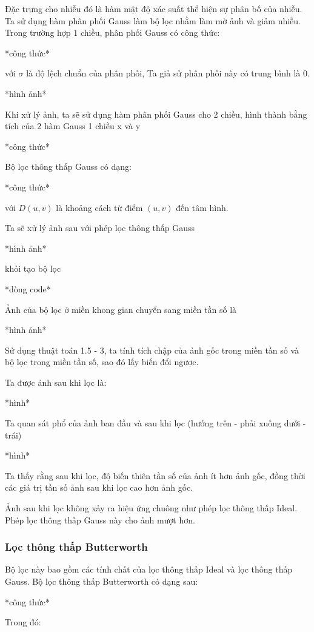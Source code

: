 \documentclass[12pt,a4paper]{report}
\numberwithin{equation}{section}
\theoremstyle{definition} %
\begin{document}
Đặc trưng cho nhiễu đó là hàm mật độ xác suất thể hiện sự phân bố của nhiễu. Ta sử dụng hàm phân phối Gauss làm bộ lọc nhằm làm mờ ảnh và giảm nhiễu. Trong trường hợp 1 chiều, phân phối Gauss có công thức:

*công thức*

với $\sigma$ là độ lệch chuẩn của phân phối, Ta giả sử phân phối này có trung bình là 0.

*hình ảnh*

Khi xử lý ảnh, ta sẽ sử dụng hàm phân phối Gauss cho 2 chiều, hình thành bằng tích của 2 hàm Gauss 1 chiều x và y 

*công thức*

Bộ lọc thông thấp Gauss có dạng:

*công thức*

với $D(u,v)$ là khoảng cách từ điểm $(u,v)$ đến tâm hình.

Ta sẽ xử lý ảnh sau với phép lọc thông thấp Gauss

*hình ảnh*

khỏi tạo bộ lọc

*dòng code*

Ảnh của bộ lọc ở miền khong gian chuyển sang miền tần số là 

*hình ảnh*

Sử dụng thuật toán 1.5 - 3, ta tính tích chập của ảnh gốc trong miền tần số và bộ lọc trong miền tần số, sao đó lấy biến đổi ngược.

Ta được ảnh sau khi lọc là:

*hình*

Ta quan sát phổ của ảnh ban đầu và sau khi lọc (hướng trên - phải xuống dưới - trái)

*hình*

Ta thấy rằng sau khi lọc, độ biến thiên tần số của ảnh ít hơn ảnh gốc, đồng thời các giá trị tần số ảnh sau khi lọc cao hơn ảnh gốc.

Ảnh sau khi lọc không xảy ra hiệu ứng chuông như phép lọc thông thấp Ideal. Phép lọc thông thấp Gauss này cho ảnh mượt hơn.
\subsubsection{Lọc thông thấp Butterworth}

Bộ lọc này bao gồm các tính chất của lọc thông thấp Ideal và lọc thông thấp Gauss. Bộ lọc thông thấp Butterworth có dạng sau:

*công thức*


Trong đó:
\end{document}
